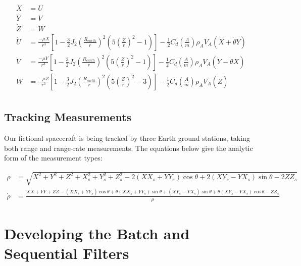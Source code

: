 \documentclass[10pt]{article}
\begin{document}
\begin{equation}
\begin{split}
\dot{X}  & = U \\
\dot{Y}  & = V \\
\dot{Z}  & = W \\
\dot{U} & = \frac{-\mu X}{r^3}\left[ 1 - \frac{3}{2}J_2\left(\frac{R_{earth}}{r}\right)^2 \left(5 \left(\frac{Z}{r}\right)^2 - 1 \right)\right]  -  \frac{1}{2} C_d \left( \frac{A}{m}\right) \rho_A V_A ( \dot{X} +  \dot{\theta}Y)\\
\dot{V} & = \frac{-\mu Y}{r^3}\left[ 1 - \frac{3}{2}J_2\left(\frac{R_{earth}}{r}\right)^2 \left(5 \left(\frac{Z}{r}\right)^2 - 1 \right)\right]  -  \frac{1}{2} C_d \left( \frac{A}{m}\right) \rho_A V_A (\dot{Y} -  \dot{\theta}X) \\
\dot{W} & = \frac{-\mu Z}{r^3}\left[ 1 - \frac{3}{2}J_2\left(\frac{R_{earth}}{r}\right)^2 \left(5 \left(\frac{Z}{r}\right)^2 - 3 \right)\right] -  \frac{1}{2} C_d \left( \frac{A}{m}\right) \rho_A V_A ( \dot{Z}) \\
\end{split}
\end{equation}

\subsection{Tracking Measurements}

Our fictional spacecraft is being tracked by three Earth ground stations, taking both range and range-rate measurements. The equations below give the analytic form of the measurement types:

\begin{equation}
\begin{split}
\rho  & = \sqrt{X^2 + Y^2 + Z^2 + X_s^2 + Y_s^2 + Z_s^2 - 2 (X  X_s + Y  Y_s )\cos{\theta} + 2( X Y_s - Y X_s)\sin{\theta} - 2 Z Z_s}  \\
\dot{\rho} & = \frac{X \dot{X} + Y \dot{Y} + Z \dot{Z} - (\dot{X} X_s + \dot{Y} Y_s ) \cos{\theta} + \dot{\theta} (X X_s + Y Y_s) \sin{\theta} + (\dot{X} Y_s - \dot{Y} X_s) \sin{\theta} + \dot{\theta} (X Y_s - Y X_s) \cos{\theta} - Z Z_s}{\rho}
\end{split}
\end{equation}


\section{Developing the Batch and Sequential Filters}
\end{document}
